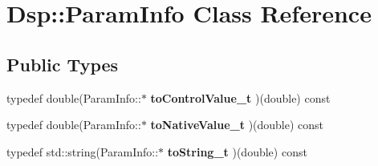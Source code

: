 \hypertarget{classDsp_1_1ParamInfo}{\section{Dsp\-:\-:Param\-Info Class Reference}
\label{classDsp_1_1ParamInfo}
}
\subsection*{Public Types}
\begin{DoxyCompactItemize}
\item 
\hypertarget{classDsp_1_1ParamInfo_ad8db2a15c0f661552d7a72139934459c}{typedef double(Param\-Info\-::$\ast$ {\bfseries to\-Control\-Value\-\_\-t} )(double) const }\label{classDsp_1_1ParamInfo_ad8db2a15c0f661552d7a72139934459c}

\item 
\hypertarget{classDsp_1_1ParamInfo_af63f46674a70a3bcc763331faf53c1bd}{typedef double(Param\-Info\-::$\ast$ {\bfseries to\-Native\-Value\-\_\-t} )(double) const }\label{classDsp_1_1ParamInfo_af63f46674a70a3bcc763331faf53c1bd}

\item 
\hypertarget{classDsp_1_1ParamInfo_aae48d9a4cce89b7e0f733df9b7f7bd05}{typedef std\-::string(Param\-Info\-::$\ast$ {\bfseries to\-String\-\_\-t} )(double) const }\label{classDsp_1_1ParamInfo_aae48d9a4cce89b7e0f733df9b7f7bd05}

\end{DoxyCompactItemize}
